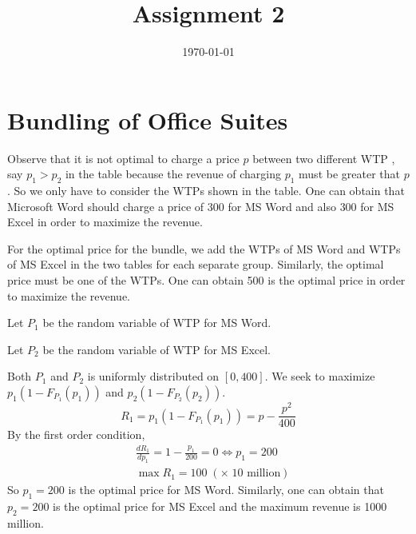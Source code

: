 \documentclass[a4paper]{article}
\date{\today}
\title{Assignment 2}
\newcommand{\T}{\top}
\newcommand{\expdist}[2]{%
        \normalfont{\textsc{Exp}}(#1, #2)%
    }
\newcommand{\expparam}{\bm \lambda}
\newcommand{\natparam}{\bm \eta}
\newcommand{\sufstat}{\bm u}
\begin{document}
    \header{}



    
    \section{Bundling of Office Suites}
    \begin{answer}[Q1]
    Observe that it is not optimal to charge a price $p$ between two different WTP , say $p_1 > p_2$ in the table because the revenue of charging $p_1$ must be greater that $p$. So we only have to consider the WTPs shown in the table.
    One can obtain that Microsoft Word should charge a price of $300$ for MS Word and also $300$ for MS Excel in order to maximize the revenue. 
    
    \end{answer}
    
    \begin{answer}
    For the optimal price for the bundle, we add the WTPs of MS Word and WTPs of MS Excel in the two tables for each separate group. Similarly, the optimal price must be one of the WTPs. One can obtain 500 is the optimal price in order to maximize the revenue.
    \end{answer}
    
    \begin{answer}[Q3]
    Let $P_1$ be the random variable of WTP for MS Word.
    
    Let $P_2$ be the random variable of WTP for MS Excel.
    
    Both $P_1$ and $P_2$ is uniformly distributed on $[0,400]$. We seek to maximize $p_1(1-F_{P_1}(p_1))$ and $p_2(1-F_{P_2}(p_2))$. 
    \begin{equation*}
        R_1 = p_1(1-F_{P_1}(p_1)) = p - \frac{p^2}{400}
    \end{equation*}
    By the first order condition,
    \begin{align*}
        & \frac{dR_1}{dp_1} = 1 - \frac{p_1}{200} = 0 \iff p_1 = 200 \\
        & \max R_1 = 100 \; (\times \; 10 \text{ million} )
    \end{align*}
    So $p_1 = 200$ is the optimal price for MS Word. Similarly, one can obtain that $p_2 = 200$ is the optimal price for MS Excel and the maximum revenue is 1000 million.
    \end{answer}
    
\end{document}
